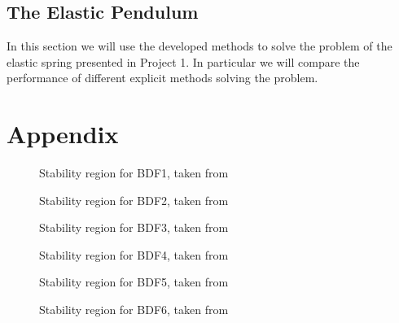 \documentclass{report}
\begin{document}
\section*{The Elastic Pendulum}

In this section we will use the developed methods to solve the problem of the elastic spring presented in Project 1. In particular we will compare the performance of different explicit methods solving the problem.



\chapter*{Appendix}


\begin{figure}[h]
\centering
\begin{minipage}[b]{0.45\textwidth}
\centering
\hspace*{-1cm}
\scalebox{0.32}{

}
\caption{Stability region for BDF1, taken from \cite{Stab_BDF}}
\end{minipage}
\hfill
\begin{minipage}[b]{0.45\textwidth}
\centering
\hspace*{-1cm}
\scalebox{0.32}{

}
\caption{Stability region for BDF2, taken from \cite{Stab_BDF}}
\end{minipage}
\end{figure}


\begin{figure}[h]
\centering
\begin{minipage}[b]{0.45\textwidth}
\centering
\hspace*{-1cm}
\scalebox{0.32}{

}
\caption{Stability region for BDF3, taken from \cite{Stab_BDF}}
\end{minipage}
\hfill
\begin{minipage}[b]{0.45\textwidth}
\centering
\hspace*{-1cm}
\scalebox{0.32}{

}
\caption{Stability region for BDF4, taken from \cite{Stab_BDF}}
\end{minipage}
\end{figure}


\begin{figure}[h]
\centering
\begin{minipage}[b]{0.45\textwidth}
\centering
\hspace*{-1cm}
\scalebox{0.32}{

}
\caption{Stability region for BDF5, taken from \cite{Stab_BDF}}
\end{minipage}
\hfill
\begin{minipage}[b]{0.45\textwidth}
\centering
\hspace*{-1cm}
\scalebox{0.32}{

}
\caption{Stability region for BDF6, taken from \cite{Stab_BDF}}
\end{minipage}
\end{figure}



\printbibliography
\end{document}
